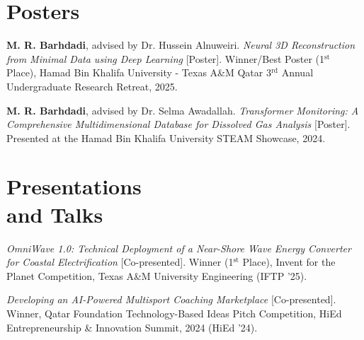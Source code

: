 \documentclass[resmargin, 10pt]{res} %
\begin{document}
\begin{resume}
\vspace{-3pt}

\section{Posters } 

{\bf M. R. Barhdadi}, advised by Dr. Hussein Alnuweiri. {\sl Neural 3D Reconstruction from Minimal Data using Deep Learning} [Poster]. Winner/Best Poster (1$^{\text{st}}$ Place), Hamad Bin Khalifa University - Texas A\&M Qatar 3$^{\text{rd}}$ Annual Undergraduate Research Retreat, 2025.

\vspace{-4pt}

{\bf M. R. Barhdadi}, advised by Dr. Selma Awadallah. {\sl Transformer Monitoring: A Comprehensive Multidimensional Database for Dissolved Gas Analysis} [Poster]. Presented at the Hamad Bin Khalifa University STEAM Showcase, 2024.


\vspace{-3pt}
\section{Presentations \\ and Talks} 

{\sl OmniWave 1.0: Technical Deployment of a Near-Shore Wave Energy Converter for Coastal Electrification} [Co-presented]. Winner (1$^{\text{st}}$ Place), Invent for the Planet Competition, Texas A\&M University Engineering (IFTP '25).

\vspace{-4pt}

{\sl Developing an AI-Powered Multisport Coaching Marketplace} [Co-presented]. Winner, Qatar Foundation Technology-Based Ideas Pitch Competition, HiEd Entrepreneurship \& Innovation Summit, 2024 (HiEd '24).

\vspace{-3pt}

\end{resume}
\end{document}
